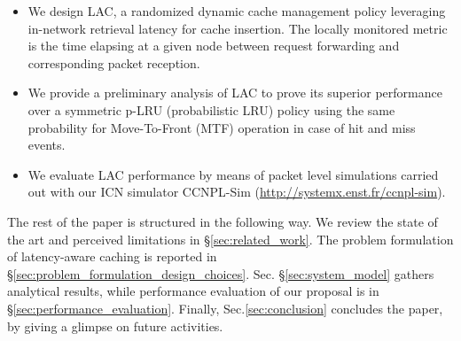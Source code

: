 \documentclass[conference]{IEEEtran}
\begin{document}
\begin{itemize}
\item We design LAC, a randomized dynamic cache management 
policy leveraging in-network retrieval latency for cache 
insertion. The locally monitored metric is the time elapsing 
at a given node between request forwarding and corresponding 
packet reception.

\item We provide a preliminary analysis of LAC
to prove its superior performance over a symmetric p-LRU 
(probabilistic LRU) policy using 
the same probability  for Move-To-Front (MTF) operation in 
case of hit and miss events. 

\item We evaluate LAC performance
by means of packet level simulations carried out with our ICN simulator CCNPL-Sim (\url{http://systemx.enst.fr/ccnpl-sim}). 
\end{itemize}

The rest of the paper is structured in the following way. We 
review the state of the art and perceived limitations in 
\S\ref{sec:related_work}. The problem formulation of 
latency-aware caching is reported in 
\S\ref{sec:problem_formulation_design_choices}.
Sec. \S\ref{sec:system_model} gathers analytical results, 
while performance evaluation of our proposal is in 
\S\ref{sec:performance_evaluation}.
Finally, Sec.\ref{sec:conclusion} concludes the paper, by 
giving a glimpse on future activities.
\end{document}
